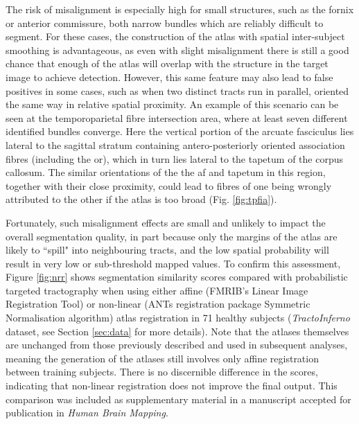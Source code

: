The risk of misalignment is especially high for small structures, such as the fornix or anterior commissure, both narrow bundles which are reliably difficult to segment.
For these cases, the construction of the atlas with spatial inter-subject smoothing is advantageous, as even with slight misalignment there is still a good chance that enough of the atlas will overlap with the structure in the target image to achieve detection.
However, this same feature may also lead to false positives in some cases, such as when two distinct tracts run in parallel, oriented the same way in relative spatial proximity.
An example of this scenario can be seen at the temporoparietal fibre intersection area, where at least seven different identified bundles converge\autocite{Martino2013}.
Here the vertical portion of the arcuate fasciculus lies lateral to the sagittal stratum containing antero-posteriorly oriented association fibres (including the \gls{or}), which in turn lies lateral to the tapetum of the corpus callosum.
The similar orientations of the the \gls{af} and tapetum in this region, together with their close proximity, could lead to fibres of one being wrongly attributed to the other if the atlas is too broad (Fig. \ref{fig:tpfia}).

\begin{SCfigure}[][h!]
  \captionsetup{format=plain}
  
  \caption{Example of potential for atlas misalignment. The \gls{af} (A) and tapetum (T) are proximal and parallel at the temporoparietal fibre intersection area. Linearly registered right \gls{af} atlas \glspl{tod} may overlap with tapetum (arrowhead).}
  \label{fig:tpfia}
\end{SCfigure}

Fortunately, such misalignment effects are small and unlikely to impact the overall segmentation quality, in part because only the margins of the atlas are likely to ``spill" into neighbouring tracts, and the low spatial probability will result in very low or sub-threshold mapped values.
To confirm this assessment, Figure \ref{fig:nrr} shows segmentation similarity scores compared with probabilistic targeted tractography when using either affine (FMRIB's Linear Image Registration Tool\autocite{Jenkinson2002}) or non-linear (ANTs registration package Symmetric Normalisation algorithm\autocite{Tustison2013,Avants2011}) atlas registration in 71 healthy subjects (\textit{TractoInferno} dataset, see Section \ref{sec:data} for more details).
Note that the atlases themselves are unchanged from those previously described and used in subsequent analyses, meaning the generation of the atlases still involves only affine registration between training subjects.
There is no discernible difference in the scores, indicating that non-linear registration does not improve the final output.
This comparison was included as supplementary material in a manuscript accepted for publication in \textit{Human Brain Mapping}\autocite{Young2024}.

